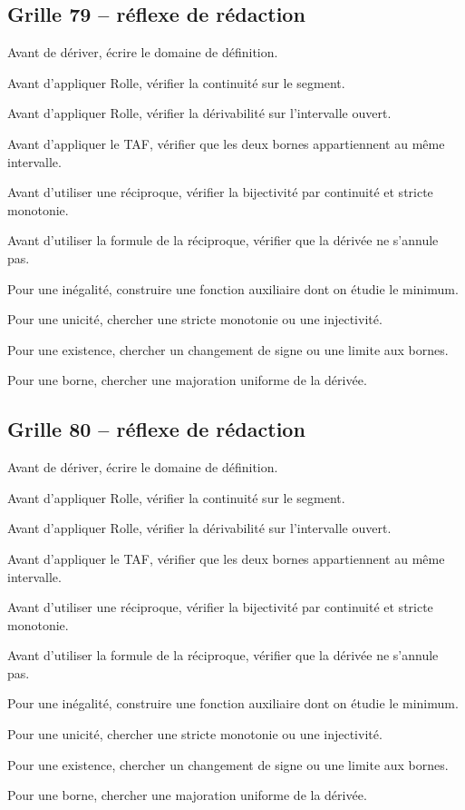 \documentclass[11pt,a4paper]{article}
\begin{document}
\subsection*{Grille 79 -- réflexe de rédaction}

\begin{methodebox}

Avant de dériver, écrire le domaine de définition.

Avant d'appliquer Rolle, vérifier la continuité sur le segment.

Avant d'appliquer Rolle, vérifier la dérivabilité sur l'intervalle ouvert.

Avant d'appliquer le TAF, vérifier que les deux bornes appartiennent au même intervalle.

Avant d'utiliser une réciproque, vérifier la bijectivité par continuité et stricte monotonie.

Avant d'utiliser la formule de la réciproque, vérifier que la dérivée ne s'annule pas.

Pour une inégalité, construire une fonction auxiliaire dont on étudie le minimum.

Pour une unicité, chercher une stricte monotonie ou une injectivité.

Pour une existence, chercher un changement de signe ou une limite aux bornes.

Pour une borne, chercher une majoration uniforme de la dérivée.

\end{methodebox}

\subsection*{Grille 80 -- réflexe de rédaction}

\begin{methodebox}

Avant de dériver, écrire le domaine de définition.

Avant d'appliquer Rolle, vérifier la continuité sur le segment.

Avant d'appliquer Rolle, vérifier la dérivabilité sur l'intervalle ouvert.

Avant d'appliquer le TAF, vérifier que les deux bornes appartiennent au même intervalle.

Avant d'utiliser une réciproque, vérifier la bijectivité par continuité et stricte monotonie.

Avant d'utiliser la formule de la réciproque, vérifier que la dérivée ne s'annule pas.

Pour une inégalité, construire une fonction auxiliaire dont on étudie le minimum.

Pour une unicité, chercher une stricte monotonie ou une injectivité.

Pour une existence, chercher un changement de signe ou une limite aux bornes.

Pour une borne, chercher une majoration uniforme de la dérivée.

\end{methodebox}
\end{document}
